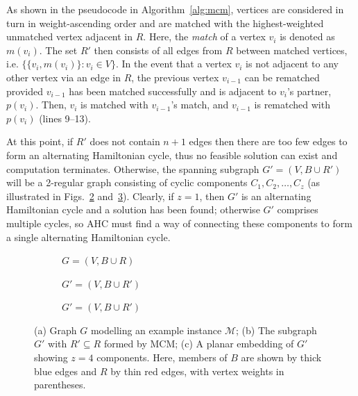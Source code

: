 \documentclass[a4paper,11pt,authoryear]{elsarticle}
\begin{document}
As shown in the pseudocode in Algorithm~\ref{alg:mcm}, vertices are considered in turn in weight-ascending order and are matched with the highest-weighted unmatched vertex adjacent in $R$. Here, the \emph{match} of a vertex $v_i$ is denoted as $m(v_i)$. The set $R'$ then consists of all edges from $R$ between matched vertices, i.e. $\{\{v_i, m(v_i)\} : v_i \in V \}$. In the event that a vertex $v_i$ is not adjacent to any other vertex via an edge in $R$, the previous vertex $v_{i-1}$ can be rematched provided $v_{i-1}$ has been matched successfully and is adjacent to $v_i$'s partner, $p(v_i)$. Then, $v_i$ is matched with $v_{i-1}$'s match, and $v_{i-1}$ is rematched with $p(v_i)$ (lines 9--13).

At this point, if $R'$ does not contain $n+1$ edges then there are too few edges to form an alternating Hamiltonian cycle, thus no feasible solution can exist and computation terminates. Otherwise, the spanning subgraph $G'=(V, B \cup R')$ will be a 2-regular graph consisting of cyclic components $C_1,C_2,\dotsc,C_z$ (as illustrated in Figs.~\ref{fig:matching} and~\ref{fig:mps}). Clearly, if $z = 1$, then $G'$ is an alternating Hamiltonian cycle and a solution has been found; otherwise $G'$ comprises multiple cycles, so AHC must find a way of connecting these components to form a single alternating Hamiltonian cycle.

\begin{figure}[h!]	
	\centering
	\begin{subfigure}[h]{0.33\textwidth}
		
		\vspace{-2mm}
		\caption{$G = (V, B \cup R)$}
		\label{fig:threshold}
	\end{subfigure} \hspace{5mm}
	\begin{subfigure}[h]{0.33\textwidth}
		
		\vspace{-2mm}
		\caption{$G' = (V, B \cup R')$}
		\label{fig:matching}
	\end{subfigure} \hspace{7mm}
	\begin{subfigure}[h]{0.2\textwidth}
		
		\caption{$G' = (V, B \cup R')$}
		\label{fig:mps}
	\end{subfigure}
	\caption{(a) Graph $G$ modelling an example instance $\mathcal{M}$; (b) The subgraph $G'$ with $R' \subseteq R$ formed by MCM; (c) A planar embedding of $G'$ showing $z = 4$ components. Here, members of $B$ are shown by thick blue edges and $R$ by thin red edges, with vertex weights in parentheses.}
	\label{fig:mcm}
\end{figure}
\end{document}
